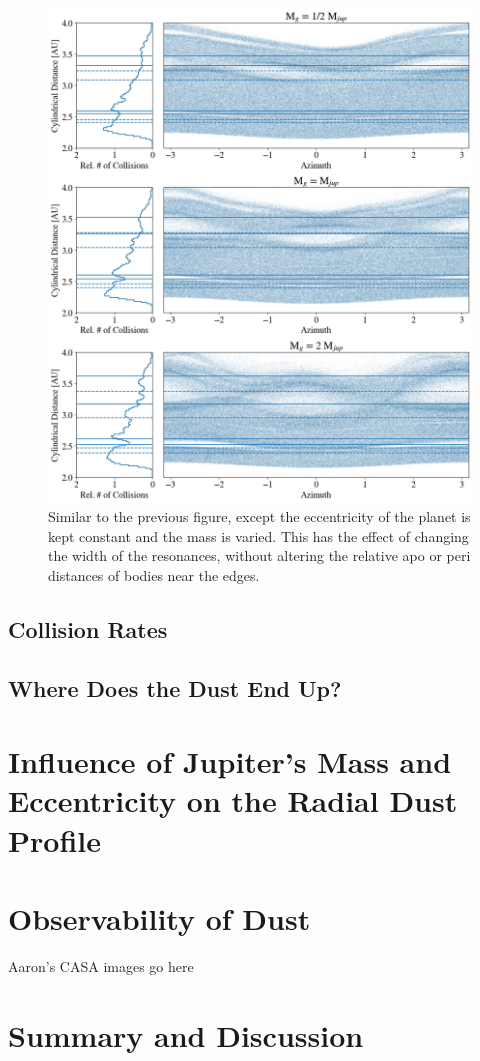 \documentclass[onecolumn]{aastex63}
\begin{document}
\begin{figure}
    \includegraphics[width=\textwidth]{figures/coll_polar_m.png}
    \caption{Similar to the previous figure, except the eccentricity of the planet is kept constant and the mass is varied.
    This has the effect of changing the width of the resonances, without altering the relative apo or peri distances of
    bodies near the edges.\label{fig:coll_polar_m}}
\end{figure}

\subsection{Collision Rates}\label{sec:coll_rates}

\subsection{Where Does the Dust End Up?}

\section{Influence of Jupiter's Mass and Eccentricity on the Radial Dust Profile}

\section{Observability of Dust} \label{sec:dust}

Aaron's CASA images go here

\section{Summary and Discussion} \label{sec:discuss}



\clearpage
\end{document}
